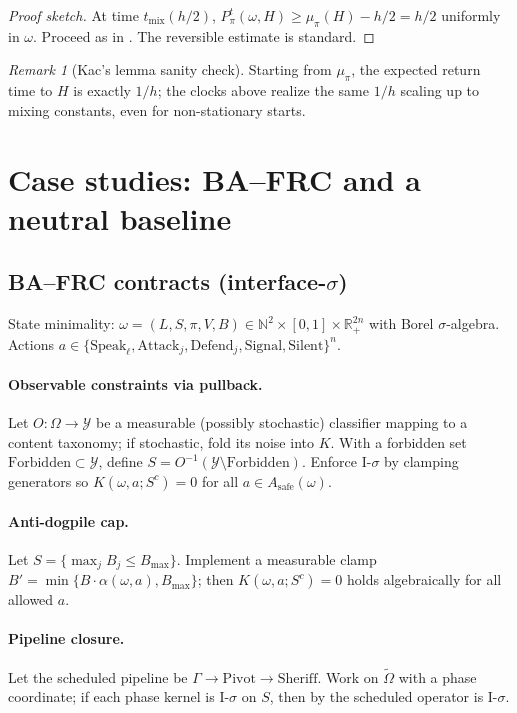 \documentclass[11pt]{article}
\theoremstyle{plain}
\theoremstyle{definition}
\theoremstyle{remark}
\newtheorem{remark}{Remark}
\newcommand{\Y}{\mathcal{Y}}
\newcommand{\mix}{\mathrm{mix}}
\begin{document}
\begin{proof}[Proof sketch]
At time $t_{\mix}(h/2)$, $P_\pi^{t}(\omega,H)\ge \mu_\pi(H)-h/2=h/2$ uniformly in $\omega$. Proceed as in . The reversible estimate is standard. \qedhere
\end{proof}

\begin{remark}[Kac's lemma sanity check]
Starting from $\mu_\pi$, the expected return time to $H$ is exactly $1/h$; the clocks above realize the same $1/h$ scaling up to mixing constants, even for non-stationary starts.
\end{remark}

\section{Case studies: BA--FRC and a neutral baseline}

\subsection{BA--FRC contracts (interface-$\sigma$)}

State minimality: $\omega=(L,S,\pi,V,B)\in \mathbb{N}^2\times [0,1]\times \mathbb{R}_+^{2n}$ with Borel $\sigma$-algebra. Actions $a\in\{\mathrm{Speak}_\ell,\mathrm{Attack}_j,\mathrm{Defend}_j,\mathrm{Signal},\mathrm{Silent}\}^n$.

\paragraph{Observable constraints via pullback.}
Let $O:\Omega\to \Y$ be a measurable (possibly stochastic) classifier mapping to a content taxonomy; if stochastic, fold its noise into $K$. With a forbidden set $\mathrm{Forbidden}\subset \Y$, define $S=O^{-1}(\Y\setminus \mathrm{Forbidden})$. Enforce I-$\sigma$ by clamping generators so $K(\omega,a;S^c)=0$ for all $a\in A_{\mathrm{safe}}(\omega)$.

\paragraph{Anti-dogpile cap.}
Let $S=\{\max_j B_j \le B_{\max}\}$. Implement a measurable clamp $B'=\min\{B\cdot \alpha(\omega,a), B_{\max}\}$; then $K(\omega,a;S^c)=0$ holds algebraically for all allowed $a$.

\paragraph{Pipeline closure.}
Let the scheduled pipeline be $\Gamma \to \mathrm{Pivot}\to \mathrm{Sheriff}$. Work on $\tilde\Omega$ with a phase coordinate; if each phase kernel is I-$\sigma$ on $S$, then by  the scheduled operator is I-$\sigma$.
\end{document}
